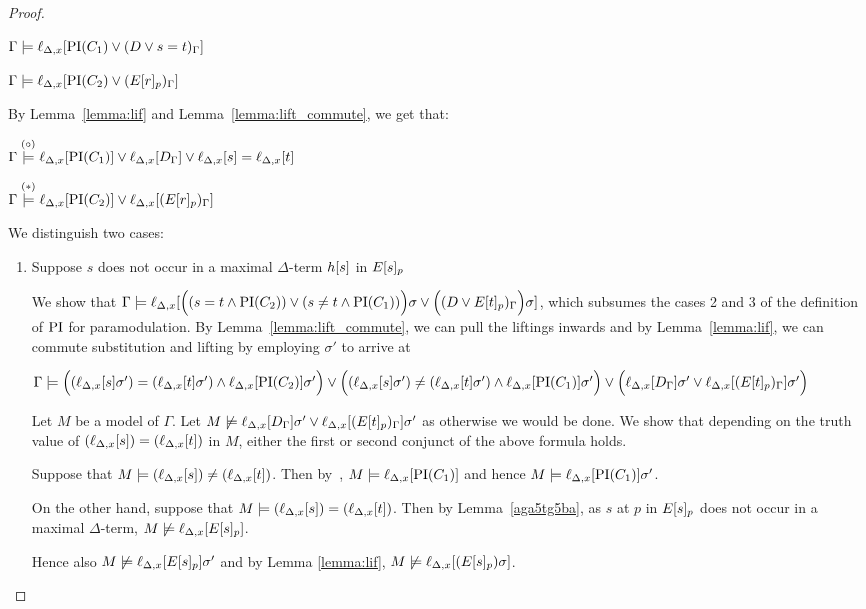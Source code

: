 \documentclass[,%
	paper=a4,%
	DIV14, 
	liststotoc,
	bibtotoc,
	draft=false,%
	numbers=noendperiod
]{scrartcl}
\newcommand{\lif}[1]{\lift{\Delta}{#1}{x}}
\begin{document}
\begin{proof}
\begin{description}
			$\Gamma \entails \lif{\PI(C_1) \lor (D\lor s=t)_\Gamma}$

			$\Gamma \entails \lif{\PI(C_2) \lor (E\occurat{r}{p})_\Gamma}$

			By Lemma~\ref{lemma:lif} and Lemma~\ref{lemma:lift_commute}, we get that:

			$\Gamma \stackrel{\markA}\entails \lif{\PI(C_1)} \lor \lif{D_\Gamma} \lor \lif{s} = \lif{t}$

			$\Gamma \stackrel{\markB}\entails \lif{\PI(C_2)} \lor \lif{(E\occurat{r}{p})_\Gamma}$
\bigskip
		

	
			We distinguish two cases:\nopagebreak
			\begin{enumerate}
				\item Suppose $s$ does not occur in a maximal $\Delta$-term $h[s]$ in $E{[s]_{p}}$

					We show that $\Gamma \entails \lif{ \Big((s=t \land \PI(C_2)) \lor (s\neq t \land \PI(C_1))\Big)\sigma \lor \Big((D \lor E\occurat{t}{p})_\Gamma\Big)\sigma}$, which subsumes the cases 2 and 3 of the definition of $\operatorname{PI}$ for paramodulation.
					By Lemma~\ref{lemma:lift_commute}, we can pull the liftings inwards and by Lemma~\ref{lemma:lif}, we can commute substitution and lifting by employing $\sigma'$ to arrive at

				$\Gamma \entails
				\Big((\lif{s}\sigma')=(\lif{t}\sigma') \land \lif{\PI(C_2)}\sigma'\Big) \lor
				\Big((\lif{s}\sigma')\neq(\lif{t}\sigma') \land \lif{\PI(C_1)}\sigma'\Big) \lor
				\Big(\lif{D_\Gamma}\sigma' \lor \lif{(E\occurat{t}{p})_\Gamma}\sigma'\Big)$

				Let $M$ be a model of $\Gamma$. Let $M \notentails \lif{D_\Gamma}\sigma' \lor \lif{(E\occurat{t}{p})_\Gamma}\sigma'$ as otherwise we would be done. We show that depending on the truth value of  $(\lif{s}) = (\lif{t})$ in $M$, either the first or second conjunct of the above formula holds.

				Suppose that $M \entails (\lif{s}) \neq (\lif{t})$. 
				Then by~\markA, $M \entails \lif{\PI(C_1)}$ and hence $M \entails \lif{\PI(C_1)}\sigma'$.

				On the other hand, suppose that $M \entails (\lif{s}) = (\lif{t})$.
				Then by Lemma~\ref{aga5tg5ba}, as $s$ at $p$ in $E{[s]_{p}}$ does not occur in a maximal $\Delta$-term, 
				$M \notentails \lif{E\occurat{s}{p}}$.

				Hence also $M \notentails \lif{E\occurat{s}{p}}\sigma'$ and
				by Lemma \ref{lemma:lif}, $M\notentails \lif{(E\occurat{s}{p})\sigma}$. 


\end{enumerate}
\end{description}
\end{proof}
\end{document}
